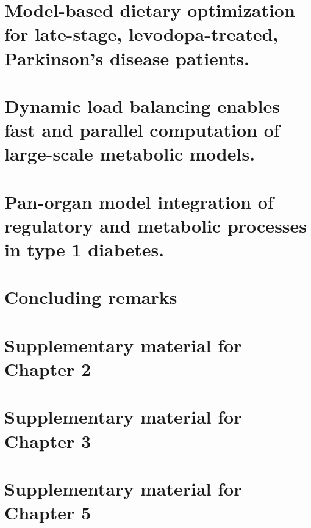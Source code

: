 \documentclass[12pt,a4paper]{book}
\begin{document}
\chapter{Model-based dietary optimization for late-stage, levodopa-treated, Parkinson's disease patients.}
\label{ch:chapter3}

\chapter{Dynamic load balancing enables fast and parallel computation of large-scale metabolic models.}
\label{ch:chapter4}

\chapter{Pan-organ model integration of regulatory and metabolic processes in type 1 diabetes.}
\label{ch:chapter5}

\chapter{Concluding remarks}
\label{ch:chapter6}




%
\appendix
\chapter{Supplementary material for Chapter 2}

\chapter{Supplementary material for Chapter 3}

\chapter{Supplementary material for Chapter 5}
\end{document}
